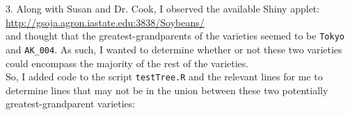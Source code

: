 \documentclass{article}\usepackage[]{graphicx}\usepackage[]{color}
\begin{document}
3. Along with Susan and Dr. Cook, I observed the available Shiny applet:\\

\hyperref[shinySBLink]{http://gsoja.agron.iastate.edu:3838/Soybeans/}\\

and thought that the greatest-grandparents of the varieties seemed to be {\tt Tokyo} and {\tt AK\_004}. As such, I wanted to determine whether or not these two varieties could encompass the majority of the rest of the varieties.\\

So, I added code to the script  {\tt testTree.R} and the relevant lines for me to determine lines that may not be in the union between these two potentially greatest-grandparent varieties:\\
\end{document}
